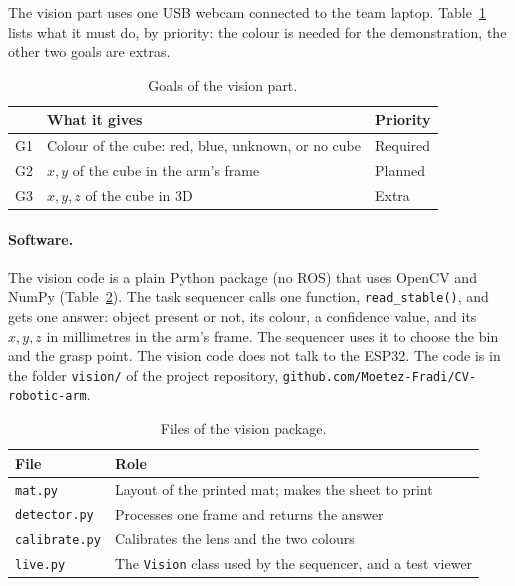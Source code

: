 
The vision part uses one USB webcam connected to the team laptop. Table~\ref{tab:cv-goals} lists what it must do, by
priority: the colour is needed for the demonstration, the other two goals are extras.

\begin{table}[h]
  \centering
  \caption{Goals of the vision part.}
  \label{tab:cv-goals}
  \begin{tabular}{@{}lll@{}}
    \toprule
    & What it gives & Priority \\ \midrule
    G1 & Colour of the cube: red, blue, unknown, or no cube & Required \\
    G2 & $x, y$ of the cube in the arm's frame & Planned \\
    G3 & $x, y, z$ of the cube in 3D & Extra \\ \bottomrule
  \end{tabular}
\end{table}

\paragraph{Software.} The vision code is a plain Python package (no ROS) that uses OpenCV and NumPy
(Table~\ref{tab:cv-modules}). The task sequencer calls one function, \texttt{read\_stable()}, and gets one answer: object
present or not, its colour, a confidence value, and its $x, y, z$ in millimetres in the arm's frame. The sequencer uses it to
choose the bin and the grasp point. The vision code does not talk to the ESP32. The code is in the folder \texttt{vision/} of the project repository,
\texttt{github.com/Moetez-Fradi/CV-robotic-arm}.

\begin{table}[h]
  \centering
  \caption{Files of the vision package.}
  \label{tab:cv-modules}
  \begin{tabular}{@{}ll@{}}
    \toprule
    File & Role \\ \midrule
    \texttt{mat.py} & Layout of the printed mat; makes the sheet to print \\
    \texttt{detector.py} & Processes one frame and returns the answer \\
    \texttt{calibrate.py} & Calibrates the lens and the two colours \\
    \texttt{live.py} & The \texttt{Vision} class used by the sequencer, and a test viewer \\ \bottomrule
  \end{tabular}
\end{table}

